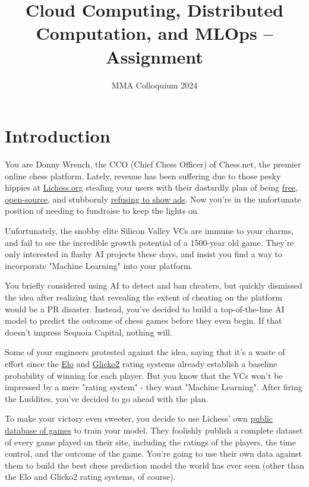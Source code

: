 \documentclass{article}
\title{Cloud Computing, Distributed Computation, and MLOps – Assignment}
\author{MMA Colloquium 2024}
\date{}
\begin{document}
\maketitle

\section*{Introduction}

You are Donny Wrench, the CCO (Chief Chess Officer) of Chess.net, the premier
online chess platform. Lately, revenue has been suffering due to those pesky
hippies at \href{https://lichess.org}{Lichess.org} stealing your users with their dastardly
plan of being \href{https://lichess.org/patron}{free}, \href{https://github.com/lichess-org/lila}{open-source},
and stubbornly \href{https://lichess.org/ads}{refusing to show ads}. Now
you're in the unfortunate position of needing to fundraise to keep the lights
on.

Unfortunately, the snobby elite Silicon Valley VCs are immune to your charms,
and fail to see the incredible growth potential of a 1500-year old game.
They're only interested in flashy AI projects these days, and insist you find
a way to incorporate "Machine Learning" into your platform.

You briefly considered using AI to detect and ban cheaters, but
quickly dismissed the idea after realizing that revealing the extent of
cheating on the platform would be a PR disaster. Instead, you've decided to
build a top-of-the-line AI model to predict the outcome of chess games before
they even begin. If that doesn't impress Sequoia Capital, nothing will.

Some of your engineers protested against the idea, saying that it's a waste of
effort since the \href{https://en.wikipedia.org/wiki/Elo_rating_system}{Elo} and
\href{https://en.wikipedia.org/wiki/Glicko_rating_system}{Glicko2} rating systems already establish a baseline
probability of winning for each player. But you know that the VCs won't be
impressed by a mere "rating system" - they want "Machine Learning". After firing
the Luddites, you've decided to go ahead with the plan.

To make your victory even sweeter, you decide to use Lichess' own \href{https://database.lichess.org/}{public database
of games} to train your model. They foolishly publish a complete dataset
of every game played on their site, including the ratings of the players, the
time control, and the outcome of the game. You're going to use their own data
against them to build the best chess prediction model the world has ever seen
(other than the Elo and Glicko2 rating systems, of course).
\end{document}
